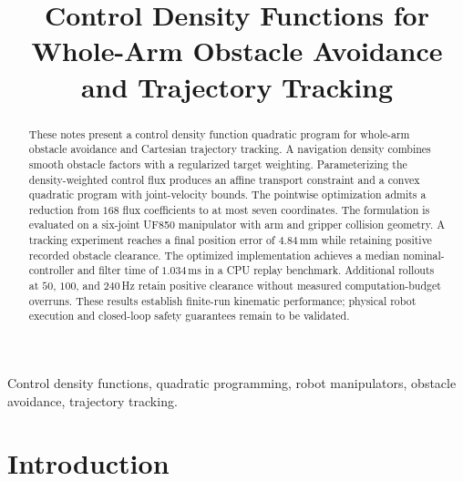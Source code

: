 \documentclass[conference]{IEEEtran}
\title{Control Density Functions for Whole-Arm
Obstacle Avoidance and Trajectory Tracking}
\author{
\IEEEauthorblockN{Author Names}
\IEEEauthorblockA{
Department and Institution\\
City, Country\\
Email addresses}
}
\begin{document}
\maketitle

\begin{abstract}
These notes present a control density function quadratic program
for whole-arm obstacle avoidance and Cartesian trajectory tracking.
A navigation density combines smooth obstacle factors with a
regularized target weighting. Parameterizing the density-weighted
control flux produces an affine transport constraint and a convex
quadratic program with joint-velocity bounds. The pointwise
optimization admits a reduction from $168$ flux coefficients
to at most seven coordinates. The formulation is evaluated on
a six-joint UF850 manipulator with arm and gripper collision
geometry. A tracking experiment reaches a final position error
of $4.84$\,mm while retaining positive recorded obstacle
clearance. The optimized implementation achieves a median
nominal-controller and filter time of $1.034$\,ms in a CPU
replay benchmark. Additional rollouts at $50$, $100$, and
$240$\,Hz retain positive clearance without measured
computation-budget overruns. These results establish finite-run
kinematic performance; physical robot execution and closed-loop
safety guarantees remain to be validated.
\end{abstract}

\begin{IEEEkeywords}
Control density functions, quadratic programming, robot
manipulators, obstacle avoidance, trajectory tracking.
\end{IEEEkeywords}

\section{Introduction}
\label{sec:introduction}
\end{document}
